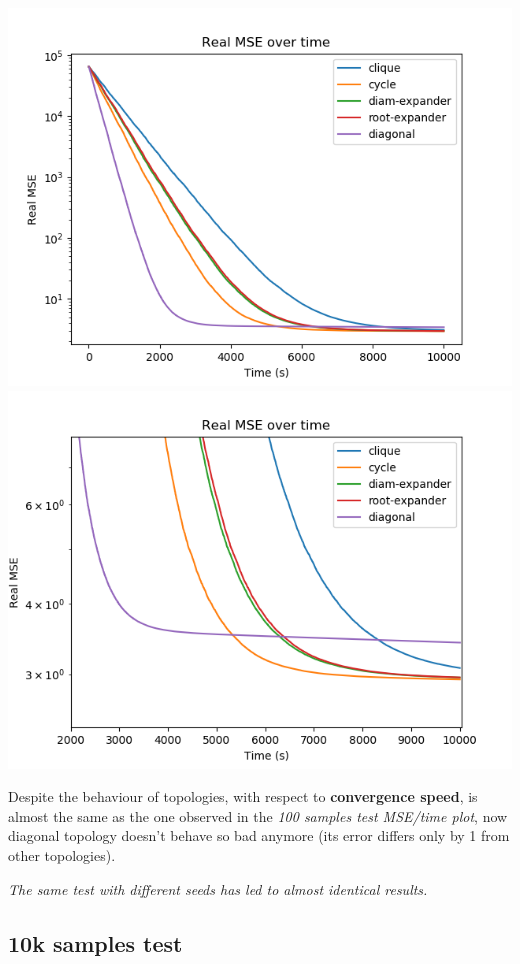 \documentclass[11pt]{article}
\makeatletter
\def\maxwidth{\ifdim\Gin@nat@width>\linewidth\linewidth
    \else\Gin@nat@width\fi}
\let\Oldincludegraphics\includegraphics
\renewcommand{\includegraphics}[1]{\Oldincludegraphics[width=.8\maxwidth]{#1}}
\makeatother
\begin{document}
\includegraphics{media/img/tests/test_003_1ksamples_classic/3_real-mse_time.png}
\includegraphics{media/img/tests/test_003_1ksamples_classic/3_real-mse_time_zoom.png}

Despite the behaviour of topologies, with respect to \textbf{convergence
speed}, is almost the same as the one observed in the \emph{100 samples
test MSE/time plot}, now diagonal topology doesn't behave so bad anymore
(its error differs only by 1 from other topologies).

\emph{The same test with different seeds has led to almost identical
results.}

    \subsection{10k samples test}\label{k-samples-test}
\end{document}
